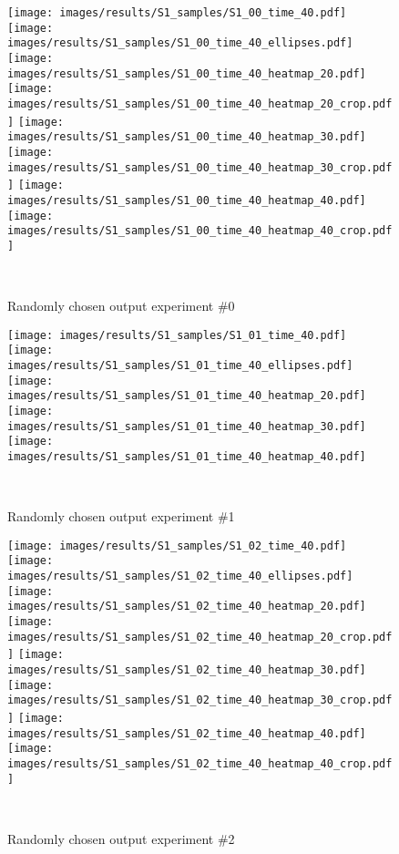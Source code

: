 \begingroup
\def\rowheight{9.5em}
\begin{figure*}[h]
\centering
\begin{minipage}[t]{\linewidth}
\texttt{[image: images/results/S1\_samples/S1\_00\_time\_40.pdf]}
\texttt{[image: images/results/S1\_samples/S1\_00\_time\_40\_ellipses.pdf]}
\texttt{[image: images/results/S1\_samples/S1\_00\_time\_40\_heatmap\_20.pdf]}
\texttt{[image: images/results/S1\_samples/S1\_00\_time\_40\_heatmap\_20\_crop.pdf]}
\texttt{[image: images/results/S1\_samples/S1\_00\_time\_40\_heatmap\_30.pdf]}
\texttt{[image: images/results/S1\_samples/S1\_00\_time\_40\_heatmap\_30\_crop.pdf]}
\texttt{[image: images/results/S1\_samples/S1\_00\_time\_40\_heatmap\_40.pdf]}
\texttt{[image: images/results/S1\_samples/S1\_00\_time\_40\_heatmap\_40\_crop.pdf]}
\end{minipage}\\
\caption{Randomly chosen output experiment \#0}
\end{figure*}
\begin{figure*}[h]
\centering
\begin{minipage}[t]{\linewidth}
\texttt{[image: images/results/S1\_samples/S1\_01\_time\_40.pdf]}
\texttt{[image: images/results/S1\_samples/S1\_01\_time\_40\_ellipses.pdf]}
\texttt{[image: images/results/S1\_samples/S1\_01\_time\_40\_heatmap\_20.pdf]}
\texttt{[image: images/results/S1\_samples/S1\_01\_time\_40\_heatmap\_30.pdf]}
\texttt{[image: images/results/S1\_samples/S1\_01\_time\_40\_heatmap\_40.pdf]}
\end{minipage}\\
\caption{Randomly chosen output experiment \#1}
\end{figure*}
\begin{figure*}[h]
\centering
\begin{minipage}[t]{\linewidth}
\texttt{[image: images/results/S1\_samples/S1\_02\_time\_40.pdf]}
\texttt{[image: images/results/S1\_samples/S1\_02\_time\_40\_ellipses.pdf]}
\texttt{[image: images/results/S1\_samples/S1\_02\_time\_40\_heatmap\_20.pdf]}
\texttt{[image: images/results/S1\_samples/S1\_02\_time\_40\_heatmap\_20\_crop.pdf]}
\texttt{[image: images/results/S1\_samples/S1\_02\_time\_40\_heatmap\_30.pdf]}
\texttt{[image: images/results/S1\_samples/S1\_02\_time\_40\_heatmap\_30\_crop.pdf]}
\texttt{[image: images/results/S1\_samples/S1\_02\_time\_40\_heatmap\_40.pdf]}
\texttt{[image: images/results/S1\_samples/S1\_02\_time\_40\_heatmap\_40\_crop.pdf]}
\end{minipage}\\
\caption{Randomly chosen output experiment \#2}
\end{figure*}
